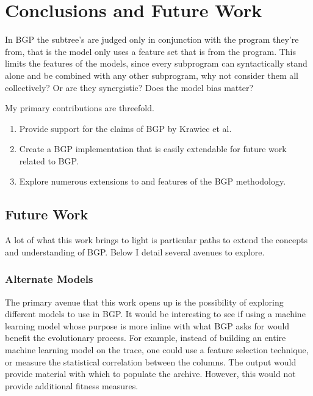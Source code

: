 \section{Conclusions and Future Work}\label{sect:conc}

In BGP the subtree's are judged only in conjunction with the program they're from, that is the model only uses a feature set that is  from the program. This limits the features of the models, since every subprogram can syntactically stand alone and be combined with any other subprogram, why not consider them all collectively? Or are they synergistic?  Does the model bias matter?

My primary contributions are threefold.

\begin{enumerate}[noitemsep]
\item Provide support for the claims of BGP by Krawiec et al.
\item Create a BGP implementation that is easily extendable for future work related to BGP.
\item Explore numerous extensions to and features of the BGP methodology.
\end{enumerate}

\subsection{Future Work}\label{section:future_work}
A lot of what this work brings to light is particular paths to extend the concepts and understanding of BGP.  Below I detail several avenues to explore.

\subsubsection{Alternate Models}
The primary avenue that this work opens up is the possibility of exploring different models to use in BGP.  It would be interesting to see if using a machine learning model whose purpose is more inline with what BGP asks for would benefit the evolutionary process.  For example, instead of building an entire machine learning model on the trace, one could use a feature selection technique, or measure the statistical correlation between the columns.  The output would provide material with which to populate the archive.  However, this would not provide additional fitness measures.

